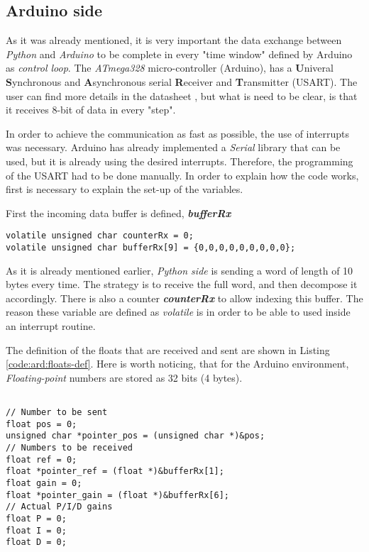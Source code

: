\subsection{Arduino side} \label{arduino_COM}

As it was already mentioned, it is very important the data exchange between \textit{Python} and \textit{Arduino} to be complete in every "time window" defined by Arduino as \textit{control loop}. The \textit{ATmega328} micro-controller (Arduino), has a \textbf{U}niveral \textbf{S}ynchronous and \textbf{A}synchronous serial \textbf{R}eceiver and \textbf{T}ransmitter (USART). The user can find more details in the datasheet \cite{Arduino}, but what is need to be clear, is that it receives 8-bit of data in every "step".

In order to achieve the communication as fast as possible, the use of interrupts was necessary. Arduino has already implemented a \textit{Serial} library that can be used, but it is already using the desired interrupts. Therefore, the programming of the USART had to be done manually. In order to explain how the code works, first is necessary to explain the set-up of the variables. 

\noindent First the incoming data buffer is defined, \textit{\textbf{bufferRx}}


\begin{lstlisting}[style=My_Arduino, caption=Buffer to store the incoming data,
	label=lst:bufferRx]
volatile unsigned char counterRx = 0; 
volatile unsigned char bufferRx[9] = {0,0,0,0,0,0,0,0,0};
\end{lstlisting}

As it is already mentioned earlier, \textit{Python side} is sending a word of length of 10 bytes every time. The strategy is to receive the full word, and then decompose it accordingly. There is also a counter \textit{\textbf{counterRx}} to allow indexing this buffer. The reason these variable are defined as \textit{volatile} is in order to be able to used inside an interrupt routine.

\noindent The definition of the floats that are received and sent are shown in Listing \ref{code:ard:floats-def}. Here is worth noticing, that for the Arduino environment, \textit{Floating-point} numbers are stored as 32 bits (4 bytes).


\begin{lstlisting}[style=My_Arduino, caption=Floats and their pointers to be sent/received,
	label=code:ard:floats-def]

// Number to be sent
float pos = 0;
unsigned char *pointer_pos = (unsigned char *)&pos;
// Numbers to be received
float ref = 0;
float *pointer_ref = (float *)&bufferRx[1];
float gain = 0;
float *pointer_gain = (float *)&bufferRx[6];
// Actual P/I/D gains
float P = 0;
float I = 0;
float D = 0;
\end{lstlisting}

